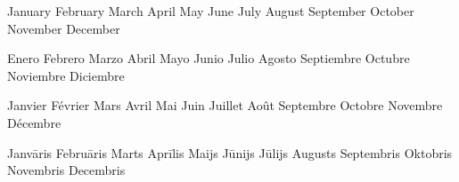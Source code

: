 \expandafter\def\csname MonthNameEn01\endcsname{January}
\expandafter\def\csname MonthNameEn02\endcsname{February}
\expandafter\def\csname MonthNameEn03\endcsname{March}
\expandafter\def\csname MonthNameEn04\endcsname{April}
\expandafter\def\csname MonthNameEn05\endcsname{May}
\expandafter\def\csname MonthNameEn06\endcsname{June}
\expandafter\def\csname MonthNameEn07\endcsname{July}
\expandafter\def\csname MonthNameEn08\endcsname{August}
\expandafter\def\csname MonthNameEn09\endcsname{September}
\expandafter\def\csname MonthNameEn10\endcsname{October}
\expandafter\def\csname MonthNameEn11\endcsname{November}
\expandafter\def\csname MonthNameEn12\endcsname{December}

\expandafter\def\csname MonthNameEs01\endcsname{Enero}
\expandafter\def\csname MonthNameEs02\endcsname{Febrero}
\expandafter\def\csname MonthNameEs03\endcsname{Marzo}
\expandafter\def\csname MonthNameEs04\endcsname{Abril}
\expandafter\def\csname MonthNameEs05\endcsname{Mayo}
\expandafter\def\csname MonthNameEs06\endcsname{Junio}
\expandafter\def\csname MonthNameEs07\endcsname{Julio}
\expandafter\def\csname MonthNameEs08\endcsname{Agosto}
\expandafter\def\csname MonthNameEs09\endcsname{Septiembre}
\expandafter\def\csname MonthNameEs10\endcsname{Octubre}
\expandafter\def\csname MonthNameEs11\endcsname{Noviembre}
\expandafter\def\csname MonthNameEs12\endcsname{Diciembre}

\expandafter\def\csname MonthNameFr01\endcsname{Janvier}
\expandafter\def\csname MonthNameFr02\endcsname{Février}
\expandafter\def\csname MonthNameFr03\endcsname{Mars}
\expandafter\def\csname MonthNameFr04\endcsname{Avril}
\expandafter\def\csname MonthNameFr05\endcsname{Mai}
\expandafter\def\csname MonthNameFr06\endcsname{Juin}
\expandafter\def\csname MonthNameFr07\endcsname{Juillet}
\expandafter\def\csname MonthNameFr08\endcsname{Août}
\expandafter\def\csname MonthNameFr09\endcsname{Septembre}
\expandafter\def\csname MonthNameFr10\endcsname{Octobre}
\expandafter\def\csname MonthNameFr11\endcsname{Novembre}
\expandafter\def\csname MonthNameFr12\endcsname{Décembre}

\expandafter\def\csname MonthNameLv01\endcsname{Janvāris}
\expandafter\def\csname MonthNameLv02\endcsname{Februāris}
\expandafter\def\csname MonthNameLv03\endcsname{Marts}
\expandafter\def\csname MonthNameLv04\endcsname{Aprīlis}
\expandafter\def\csname MonthNameLv05\endcsname{Maijs}
\expandafter\def\csname MonthNameLv06\endcsname{Jūnijs}
\expandafter\def\csname MonthNameLv07\endcsname{Jūlijs}
\expandafter\def\csname MonthNameLv08\endcsname{Augusts}
\expandafter\def\csname MonthNameLv09\endcsname{Septembris}
\expandafter\def\csname MonthNameLv10\endcsname{Oktobris}
\expandafter\def\csname MonthNameLv11\endcsname{Novembris}
\expandafter\def\csname MonthNameLv12\endcsname{Decembris}


